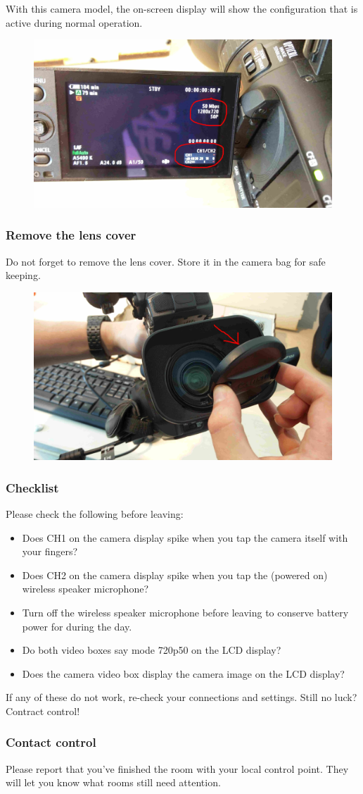 \documentclass{article}
\begin{document}
With this camera model, the on-screen display will show the configuration that is active during normal operation.
\begin{figure}[H]
  \centering
\includegraphics[width = 120mm]{Canon06.jpg}
\end{figure}

\subsubsection{Remove the lens cover}
Do not forget to remove the lens cover. Store it in the camera bag for safe keeping.

\begin{figure}[H]
  \centering
\includegraphics[width = 120mm]{Canon07.jpg}
\end{figure}

\subsubsection{Checklist}
Please check the following before leaving:
\begin{itemize}
  \item Does CH1 on the camera display spike when you tap the camera itself with your fingers?
  \item Does CH2 on the camera display spike when you tap the (powered on) wireless speaker microphone?
  \item Turn off the wireless speaker microphone before leaving to conserve battery power for during the day.
  \item Do both video boxes say mode 720p50 on the LCD display?
  \item Does the camera video box display the camera image on the LCD display?
\end{itemize}

If any of these do not work, re-check your connections and settings. Still no luck? Contract control!

\subsubsection{Contact control}
Please report that you've finished the room with your local control point.
They will let you know what rooms still need attention.
\end{document}
